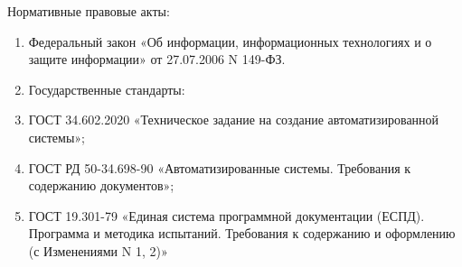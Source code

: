 \documentclass[russian, utf8, 12pt,pointsubsection,floatsubsection]{eskdtext}
\begin{document}
Нормативные правовые акты:
\begin{enumerate}
    \item Федеральный закон «Об информации, информационных технологиях и о защите информации» от 27.07.2006 N 149-ФЗ.
\item Государственные стандарты:
\item ГОСТ 34.602.2020 «Техническое задание на создание автоматизированной системы»;
\item ГОСТ РД 50-34.698-90 «Автоматизированные системы. Требования к содержанию документов»;
\item ГОСТ 19.301-79 «Единая система программной документации (ЕСПД). Программа и методика испытаний. Требования к содержанию и оформлению (с Изменениями N 1, 2)»
\end{enumerate}
\end{document}
